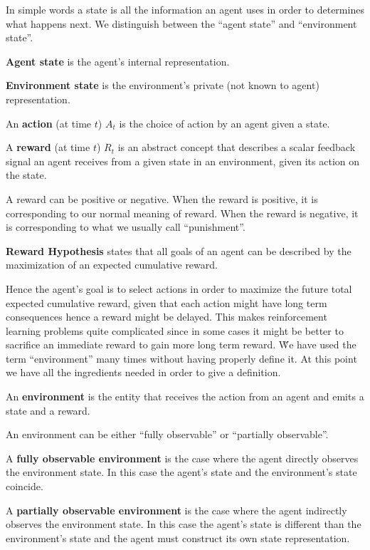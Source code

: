 In simple words a state is all the information an agent uses in order to determines what happens next. We distinguish
between the ``agent state'' and ``environment state''.

\textbf{Agent state} is the agent's internal representation.
\ed

\textbf{Environment state} is the environment's private (not known to agent) representation.
\ed

\bd[Action]
An \textbf{action} (at time $t$) $A_t$ is the choice of action by an agent
given a state.
\ed

\bd[Reward]
A \textbf{reward} (at time $t$) $R_t$ is an abstract concept that describes
a scalar feedback signal an agent
receives from a given state in an environment, given its action on the state.
\ed

A reward can be positive or negative. When the reward is positive, it is corresponding to our normal meaning of 
reward. When the reward is negative, it is corresponding to what we usually call ``punishment''.

\textbf{Reward Hypothesis} states that all goals of an agent can be described by the maximization of an expected 
cumulative reward. 
\ed

Hence the agent's goal is to select actions in order to maximize the future total expected cumulative reward, given 
that each action might have long term consequences hence a reward might be delayed. This makes reinforcement learning
problems quite complicated since in some cases it might be better to sacrifice an immediate reward to gain more long 
term reward. \v

We have used the term ``environment'' many times without having properly define it. At this point we have all the 
ingredients needed in order to give a definition.

\bd[Environment]
An \textbf{environment} is the entity that receives the action from an agent and emits a state and a reward.
\ed

An environment can be either ``fully observable'' or ``partially observable''.

A \textbf{fully observable environment} is the case where the agent directly observes the environment state. In this 
case the agent's state and the environment's state coincide. 
\ed

A \textbf{partially observable environment} is the case where the agent indirectly observes the environment state. 
In this case the agent's state is different than the environment's state and the agent must construct its own state 
representation. 
\ed

